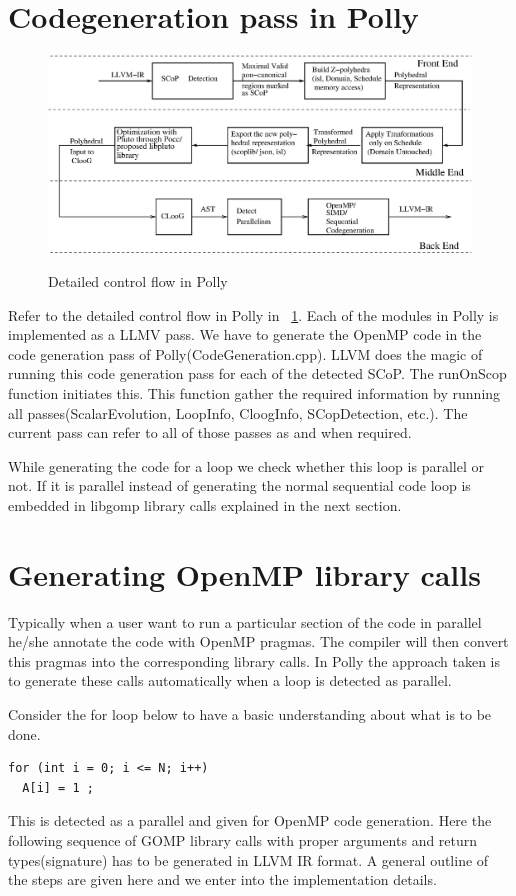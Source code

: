 \section{Codegeneration pass in Polly}
\begin{figure}
\begin{center}
  \label{detailed}
  \includegraphics[width=1\textwidth]{images/detailedarch.eps}
  \caption{Detailed control flow in Polly}
\end{center}
\end{figure}
Refer to the detailed control flow in Polly in ~\ref{detailed}. Each of the modules in Polly is
implemented as a LLMV pass\cite{llvmpass}. We have to generate the OpenMP code in the code 
generation pass of Polly(CodeGeneration.cpp). LLVM does the magic of running this code generation
pass for each of the detected SCoP. The runOnScop function initiates this. This function gather
the required information by running all passes(ScalarEvolution, LoopInfo, CloogInfo, SCopDetection, etc.).
The current pass can refer to all of those passes as and when required. 

While generating the code for a loop we check whether this loop is parallel or not. If it is
parallel instead of generating the normal sequential code  loop is embedded in
libgomp library calls explained in the next section.
\section{Generating OpenMP library calls}

Typically when a user want to run a particular section of the code in parallel he/she annotate the code with
OpenMP pragmas. The compiler will then convert this pragmas into the corresponding library calls. In Polly the
approach taken is to generate these calls automatically when a loop is detected as parallel.

Consider the for loop below to have a basic understanding about what is to be done.
{\footnotesize
\begin{lstlisting}
for (int i = 0; i <= N; i++)
  A[i] = 1 ;
\end{lstlisting}
}
This is detected as a parallel and given for OpenMP code generation. Here the following
sequence of GOMP library calls with proper arguments and return types(signature) has to be generated in
LLVM IR format. A general outline of the steps are given here and we enter into the implementation details.

